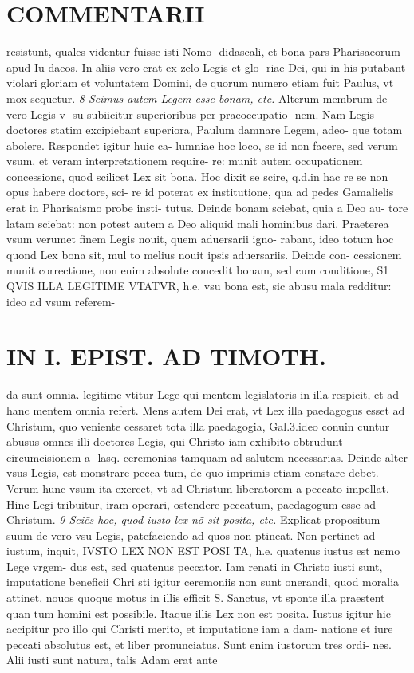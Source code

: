 \documentclass{article}
\begin{document}
\begin{pages}
\section*{COMMENTARII }\pstart resistunt, quales videntur fuisse isti Nomo- didascali, et bona pars Pharisaeorum apud Iu daeos. In aliis vero erat ex zelo Legis et glo- riae Dei, qui in his putabant violari gloriam et voluntatem Domini, de quorum numero etiam fuit Paulus, vt mox sequetur.  \pend
\textit{8 Scimus autem Legem esse bonam, etc. }\pstart Alterum membrum de vero Legis v- su subiicitur superioribus per praeoccupatio- nem. Nam Legis doctores statim excipiebant superiora, Paulum damnare Legem, adeo- que totam abolere. Respondet igitur huic ca- lumniae hoc loco, se id non facere, sed verum vsum, et veram interpretationem require- re: munit autem occupationem concessione, quod scilicet Lex sit bona. Hoc dixit se scire, q.d.in hac re se non opus habere doctore, sci- re id poterat ex institutione, qua ad pedes Gamalielis erat in Pharisaismo probe insti- tutus. Deinde bonam sciebat, quia a Deo au- tore latam sciebat: non potest autem a Deo aliquid mali hominibus dari. Praeterea vsum verumet finem Legis nouit, quem aduersarii igno- rabant, ideo totum hoc quond Lex bona sit, mul to melius nouit ipsis aduersariis. Deinde con- cessionem munit correctione, non enim absolute concedit bonam, sed cum conditione, S1 QVIS ILLA LEGITIME VTATVR, h.e. vsu bona est, sic abusu mala redditur: ideo ad vsum referem-  \pend
\section*{IN I. EPIST. AD TIMOTH. }
\marginpar{[ p.27 ]}\pstart da sunt omnia. legitime vtitur Lege qui mentem legislatoris in illa respicit, et ad hanc mentem omnia refert. Mens autem Dei erat, vt Lex illa paedagogus esset ad Christum, quo veniente cessaret tota illa paedagogia, Gal.3.ideo conuin cuntur abusus omnes illi doctores Legis, qui Christo iam exhibito obtrudunt circumcisionem a- lasq. ceremonias tamquam ad salutem necessarias. Deinde alter vsus Legis, est monstrare pecca tum, de quo imprimis etiam constare debet. Verum hunc vsum ita exercet, vt ad Christum liberatorem a peccato impellat. Hinc Legi tribuitur, iram operari, ostendere peccatum, paedagogum esse ad Christum.  \pend
\textit{9 Sciẽs hoc, quod iusto lex nõ sit posita, etc. }\pstart Explicat propositum suum de vero vsu Legis, patefaciendo ad quos non ptineat. Non pertinet ad iustum, inquit, IVSTO LEX NON EST POSI TA, h.e. quatenus iustus est nemo Lege vrgem- dus est, sed quatenus peccator. Iam renati in Christo iusti sunt, imputatione beneficii Chri sti igitur ceremoniis non sunt onerandi, quod moralia attinet, nouos quoque motus in illis efficit S. Sanctus, vt sponte illa praestent quan tum homini est possibile. Itaque illis Lex non est posita. Iustus igitur hic accipitur pro illo qui Christi merito, et imputatione iam a dam- natione et iure peccati absolutus est, et liber pronunciatus. Sunt enim iustorum tres ordi- nes. Alii iusti sunt natura, talis Adam erat ante  \pend
\marginpar{[ p.28 ]}

\end{pages}
\end{document}
